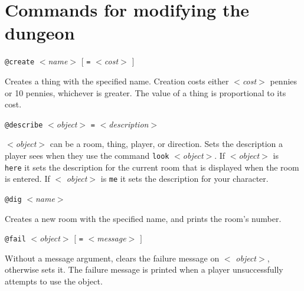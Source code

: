 \section{Commands for modifying the dungeon}
\label{sec:commands-for-modifying-the-dungeon}

\begin{simple}

\item[]
\begin{flushleft}
{\tt @create\/} $<${\em name\/}$>$ $[$ \verb|=| $<${\em cost\/}$>$ $]$
\end{flushleft}
Creates a thing with the specified name.  Creation costs either
$<${\em cost\/}$>$ pennies or 10 pennies, whichever is greater.  The
value of a thing is proportional to its cost.

\dorule

\item[]
\begin{flushleft}
{\tt @describe} $<${\em object\/}$>$ \verb|=| $<${\em description\/}$>$
\end{flushleft}
$<${\em object\/}$>$ can be a room, thing, player, or direction.  Sets
the description a player sees when they use the command {\tt look}
$<${\em object\/}$>$.  If $<${\em object\/}$>$ is {\tt
here} it sets the description for the current
room that is displayed when the room is entered.  If $<${\em
object\/}$>$ is {\tt me} it sets the description for
your character.

\dorule

\item[]
\begin{flushleft}
{\tt @dig} $<${\em name\/}$>$
\end{flushleft}
Creates a new room with the specified name, and prints the room's
number.

\dorule

\item[]
\begin{flushleft}
{\tt @fail} $<${\em object\/}$>$ $[$ \verb|=| $<${\em message\/}$>$
$]$
\end{flushleft}
Without a message argument, clears the failure message on $<${\em
object\/}$>$, otherwise sets it.  The failure message is printed when
a player unsuccessfully attempts to use the object.

\dorule


\end{simple}
